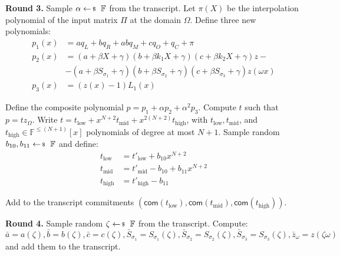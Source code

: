 \documentclass[../lecture-notes-148x210.tex]{subfiles}
\begin{document}
\textcolor{green!60!black}{\textbf{Round 3.}} Sample $\alpha \leftarrowS
\mathbb{F}$ from the transcript. Let $\pi(X)$ be the interpolation polynomial of the
input matrix $\Pi$ at the domain $\Omega$. Define three new polynomials:
\begin{align*}
p_1(x) &= aq_L + bq_R + abq_M + cq_O + q_C + \pi \\
p_2(x) &= (a + \beta X + \gamma)(b + \beta k_1 X + \gamma)(c + \beta k_2 X + \gamma)z - \\
    &- (a + \beta S_{\sigma_1} + \gamma)(b + \beta S_{\sigma_2} + \gamma)(c + \beta S_{\sigma_3} + \gamma)z(\omega x) \\
p_3(x) &= (z(x) - 1)L_1(x)
\end{align*}

Define the composite polynomial $p = p_1 + \alpha p_2 + \alpha^2 p_3$. Compute
$t$ such that $p = tz_{\Omega}$. Write $t = t_{\text{low}} +
x^{N+2}t_{\text{mid}} + x^{2(N+2)}t_{\text{high}}$, with $t_{\text{low}},
t_{\text{mid}}$, and $t_{\text{high}} \in \mathbb{F}^{\leq (N+1)}[x]$
polynomials of degree at most $N+1$. Sample random $b_{10}, b_{11}
\leftarrowS \mathbb{F}$ and define:
\begin{align*}
t_{\text{low}} &= t'_{\text{low}} + b_{10}x^{N+2} \\
t_{\text{mid}} &= t'_{\text{mid}} - b_{10} + b_{11}x^{N+2} \\
t_{\text{high}} &= t'_{\text{high}} - b_{11}
\end{align*}

Add to the transcript commitments $(\mathsf{com}(t_{\text{low}}), \mathsf{com}(t_{\text{mid}}), \mathsf{com}(t_{\text{high}}))$.

\textcolor{green!60!black}{\textbf{Round 4.}} Sample random $\zeta \leftarrowS
\mathbb{F}$ from the transcript. Compute:
\[\bar{a} = a(\zeta), \bar{b} = b(\zeta), \bar{c} = c(\zeta), \bar{S}_{\sigma_1} = S_{\sigma_1}(\zeta), \bar{S}_{\sigma_2} = S_{\sigma_2}(\zeta), \bar{S}_{\sigma_3} = S_{\sigma_3}(\zeta), \bar{z}_{\omega} = z(\zeta \omega)\]
and add them to the transcript.
\end{document}
